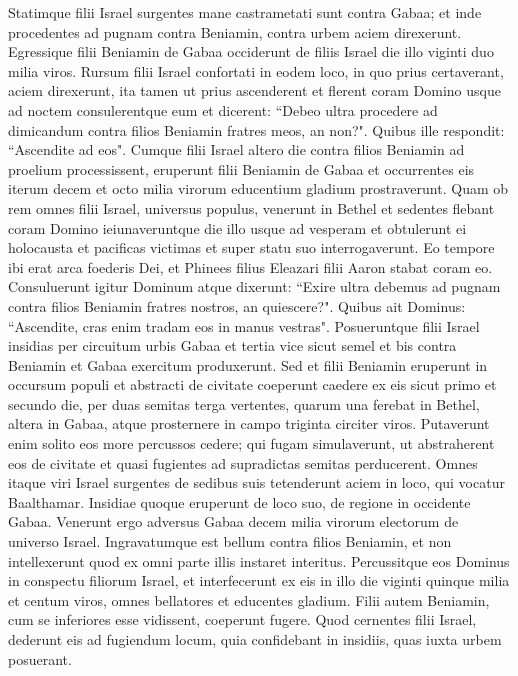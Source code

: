 \begin{biblechapter}
\verse Statimque filii Israel surgentes mane castrametati sunt contra Gabaa; 
\verse et inde procedentes ad pugnam contra Beniamin, contra urbem aciem direxerunt.  
\verse Egressique filii Beniamin de Gabaa occiderunt de filiis Israel die illo viginti duo milia viros. 
\verse Rursum filii Israel confortati in eodem loco, in quo prius certaverant, aciem direxerunt, 
\verse ita tamen ut prius ascenderent et flerent coram Domino usque ad noctem consulerentque eum et dicerent: “Debeo ultra procedere ad dimicandum contra filios Beniamin fratres meos, an non?". Quibus ille respondit: “Ascendite ad eos". 
\verse Cumque filii Israel altero die contra filios Beniamin ad proelium processissent, 
\verse eruperunt filii Beniamin de Gabaa et occurrentes eis iterum decem et octo milia virorum educentium gladium prostraverunt. 
\verse Quam ob rem omnes filii Israel, universus populus, venerunt in Bethel et sedentes flebant coram Domino ieiunaveruntque die illo usque ad vesperam et obtulerunt ei holocausta et pacificas victimas 
\verse et super statu suo interrogaverunt. Eo tempore ibi erat arca foederis Dei, 
\verse et Phinees filius Eleazari filii Aaron stabat coram eo. Consuluerunt igitur Dominum atque dixerunt: “Exire ultra debemus ad pugnam contra filios Beniamin fratres nostros, an quiescere?". Quibus ait Dominus: “Ascendite, cras enim tradam eos in manus vestras". 
\verse Posueruntque filii Israel insidias per circuitum urbis Gabaa 
\verse et tertia vice sicut semel et bis contra Beniamin et Gabaa exercitum produxerunt. 
\verse Sed et filii Beniamin eruperunt in occursum populi et abstracti de civitate coeperunt caedere ex eis sicut primo et secundo die, per duas semitas terga vertentes, quarum una ferebat in Bethel, altera in Gabaa, atque prosternere in campo triginta circiter viros. 
\verse Putaverunt enim solito eos more percussos cedere; qui fugam simulaverunt, ut abstraherent eos de civitate et quasi fugientes ad supradictas semitas perducerent. 
\verse Omnes itaque viri Israel surgentes de sedibus suis tetenderunt aciem in loco, qui vocatur Baalthamar. Insidiae quoque eruperunt de loco suo, de regione in occidente Gabaa. 
\verse Venerunt ergo adversus Gabaa decem milia virorum electorum de universo Israel. Ingravatumque est bellum contra filios Beniamin, et non intellexerunt quod ex omni parte illis instaret interitus. 
\verse Percussitque eos Dominus in conspectu filiorum Israel, et interfecerunt ex eis in illo die viginti quinque milia et centum viros, omnes bellatores et educentes gladium. 
\verse Filii autem Beniamin, cum se inferiores esse vidissent, coeperunt fugere. Quod cernentes filii Israel, dederunt eis ad fugiendum locum, quia confidebant in insidiis, quas iuxta urbem posuerant. 

\end{biblechapter}
